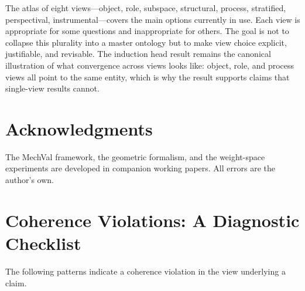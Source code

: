 \documentclass[11pt]{article}
\theoremstyle{remark}
\begin{document}
The atlas of eight views---object, role, subspace, structural, process,
stratified, perspectival, instrumental---covers the main options
currently in use.  Each view is appropriate for some questions and
inappropriate for others.  The goal is not to collapse this plurality
into a master ontology but to make view choice explicit, justifiable,
and revisable.  The induction head result remains the canonical
illustration of what convergence across views looks like: object, role,
and process views all point to the same entity, which is why the result
supports claims that single-view results cannot.

\section*{Acknowledgments}

The MechVal framework, the geometric formalism, and the
weight-space experiments are developed in companion working papers.
All errors are the author's own.

\appendix
\section{Coherence Violations: A Diagnostic Checklist}

The following patterns indicate a coherence violation in the view
underlying a claim.
\end{document}
